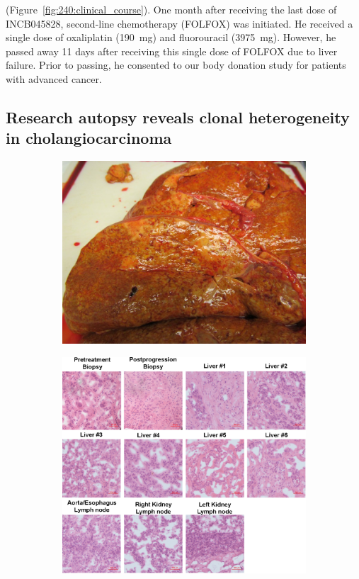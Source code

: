(Figure~\ref{fig:240:clinical_course}). One month after receiving the last dose of INCB045828, second-line chemotherapy (FOLFOX) was initiated. He received a single dose of oxaliplatin (190~mg) and fluorouracil (3975~mg). However, he passed away 11 days after receiving this single dose of FOLFOX due to liver failure. Prior to passing, he consented to our body donation study for patients with advanced cancer.
\subsection{Research autopsy reveals clonal heterogeneity in cholangiocarcinoma}
\label{ssec:240:autopsy_results}

\begin{figure}[htp]
    \centering
    \begin{subfigure}{0.6\textwidth}
        \includegraphics[width=\textwidth,keepaspectratio]{images/240/autopsy_gross}
        \caption{}\label{fig:240:autopsy_gross}
    \end{subfigure}\par
    \begin{subfigure}{0.7\textwidth}
        \includegraphics[width=\textwidth,keepaspectratio]{images/240/histo}

\end{subfigure}
\end{figure}
